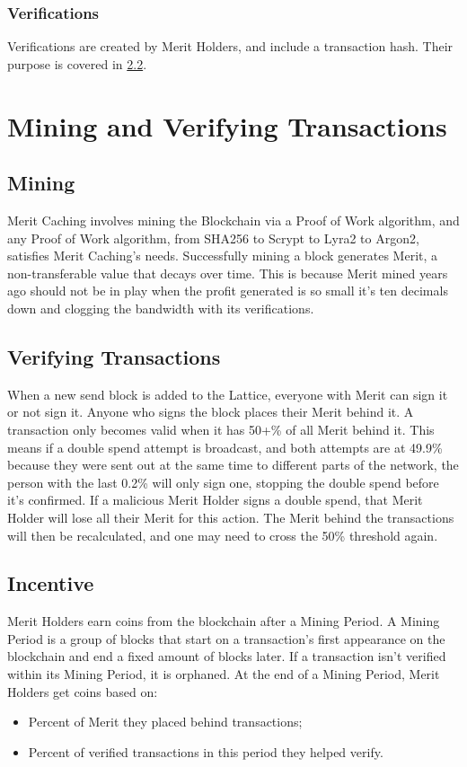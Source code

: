 \documentclass[14pt]{article}
\begin{document}
\label{sec:1.2.2}
\subsubsection{Verifications}
Verifications are created by Merit Holders, and include a transaction hash. Their purpose is covered in \hyperref[sec:2.2]{2.2}.

\newpage

\label{sec:2}
\section{Mining and Verifying Transactions}

\label{sec:2.1}
\subsection{Mining}
Merit Caching involves mining the Blockchain via a Proof of Work algorithm, and any Proof of Work algorithm, from SHA256 to Scrypt to Lyra2 to Argon2, satisfies Merit Caching's needs. Successfully mining a block generates Merit, a non-transferable value that decays over time. This is because Merit mined years ago should not be in play when the profit generated is so small it's ten decimals down and clogging the bandwidth with its verifications.

\label{sec:2.2}
\subsection{Verifying Transactions}
When a new send block is added to the Lattice, everyone with Merit can sign it or not sign it. Anyone who signs the block places their Merit behind it. A transaction only becomes valid when it has 50+\% of all Merit behind it. This means if a double spend attempt is broadcast, and both attempts are at 49.9\% because they were sent out at the same time to different parts of the network, the person with the last 0.2\% will only sign one, stopping the double spend before it's confirmed. If a malicious Merit Holder signs a double spend, that Merit Holder will lose all their Merit for this action. The Merit behind the transactions will then be recalculated, and one may need to cross the 50\% threshold again.

\newpage

\label{sec:2.3}
\subsection{Incentive}
Merit Holders earn coins from the blockchain after a Mining Period. A Mining Period is a group of blocks that start on a transaction’s first appearance on the blockchain and end a fixed amount of blocks later. If a transaction isn’t verified within its Mining Period, it is orphaned. At the end of a Mining Period, Merit Holders get coins based on:
\begin{itemize}
\item Percent of Merit they placed behind transactions;
\item Percent of verified transactions in this period they helped verify.
\end{itemize}
\end{document}
